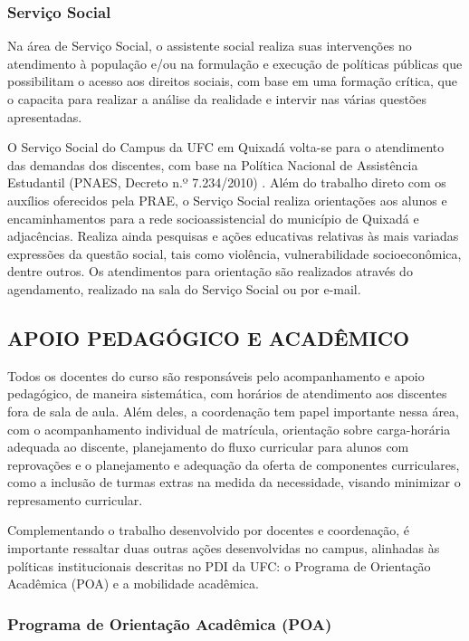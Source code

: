\subsubsection{Serviço Social}

Na área de Serviço Social, o assistente social realiza suas intervenções no atendimento à população e/ou na formulação e execução de políticas públicas que possibilitam o acesso aos direitos sociais, com base em uma formação crítica, que o capacita para realizar a análise da realidade e intervir nas várias questões apresentadas.

O Serviço Social do Campus da UFC em Quixadá volta-se para o atendimento das demandas dos discentes, com base na Política Nacional de Assistência Estudantil (PNAES, Decreto n.º 7.234/2010) \cite{decreto_7234_2010}. Além do trabalho direto com os auxílios oferecidos pela PRAE, o Serviço Social realiza orientações aos alunos e encaminhamentos para a rede socioassistencial do município de Quixadá e adjacências. Realiza ainda pesquisas e ações educativas relativas às mais variadas expressões da questão social, tais como violência, vulnerabilidade socioeconômica, dentre outros. Os atendimentos para orientação são realizados através do agendamento, realizado na sala do Serviço Social ou por e-mail.

\subsection{APOIO PEDAGÓGICO E ACADÊMICO}

Todos os docentes do curso são responsáveis pelo acompanhamento e apoio pedagógico, de maneira sistemática, com horários de atendimento aos discentes fora de sala de aula. Além deles, a coordenação tem papel importante nessa área, com o acompanhamento individual de matrícula, orientação sobre carga-horária adequada ao discente, planejamento do fluxo curricular para alunos com reprovações e o planejamento e adequação da oferta de componentes curriculares, como a inclusão de turmas extras na medida da necessidade, visando minimizar o represamento curricular.

Complementando o trabalho desenvolvido por docentes e coordenação, é importante ressaltar duas outras ações desenvolvidas no campus, alinhadas às políticas institucionais descritas no PDI da UFC: o Programa de Orientação Acadêmica (POA) e a mobilidade acadêmica.

\subsubsection{Programa de Orientação Acadêmica (POA)}
\label{sec:POA}

